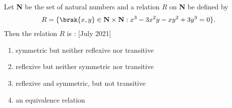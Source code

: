 \item Let \textbf{N} be the set of natural numbers and a relation $R$ on \textbf{N} be defined by 
\begin{align*}
 R = \{ \brak{x, y} \in \textbf{N} \times \textbf{N}: x^3 - 3x^2y - xy^2 + 3y^3 = 0 \}.
\end{align*}
Then the relation $R$ is : \hfill[July 2021]
\begin{enumerate}
    \item symmetric but neither reflexive nor transitive
    \item reflexive but neither symmetric nor transitive
    \item reflexive and symmetric, but not transitive
    \item an equivalence relation\\
\end{enumerate}
